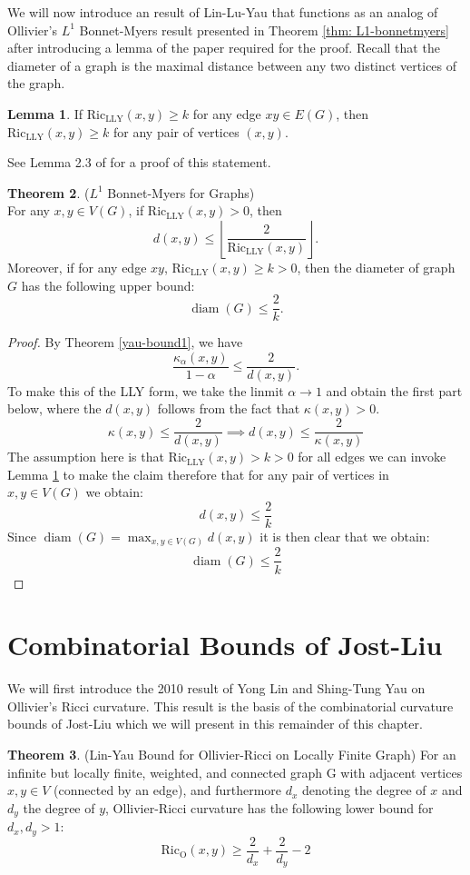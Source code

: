\documentclass{Dissertate}
\theoremstyle{definition}
\newtheorem{theorem}{Theorem}[section]
\theoremstyle{definition} %
\newtheorem{lemma}[theorem]{Lemma}
\theoremstyle{definition}
\begin{document}
We will now introduce an result of Lin-Lu-Yau that functions as an analog of Ollivier's $L^1$ Bonnet-Myers result presented in Theorem \ref{thm: L1-bonnetmyers} after introducing a lemma of the paper required for the proof. Recall that the diameter of a graph is the maximal distance between any two distinct vertices of the graph. 

\begin{lemma} \label{lemma2.3}
If \( \operatorname{Ric_{LLY}}(x, y) \geq k \) for any edge \( xy \in E(G) \), then \( \operatorname{Ric_{LLY}}(x, y) \geq k \) for any pair of vertices \( (x, y) \).
\end{lemma}

See Lemma 2.3 of \cite{lin_ricci_2011} for a proof of this statement. 

\begin{theorem} ($L^1$ Bonnet-Myers for Graphs)\\ 
For any \( x, y \in V(G) \), if \( \operatorname{Ric_{LLY}}(x, y) > 0 \), then
\[
d(x, y) \leq \left\lfloor \frac{2}{\operatorname{Ric_{LLY}}(x, y)} \right\rfloor.
\]
Moreover, if for any edge \( xy \), \( \operatorname{Ric_{LLY}}(x, y) \geq k > 0 \), then the diameter of graph \( G \) has the following upper bound:
$$
\operatorname{diam}(G) \leq \frac{2}{k}.
$$
\end{theorem}
\begin{proof}
By Theorem \ref{yau-bound1}, we have
\[
\frac{\kappa_\alpha(x, y)}{1 - \alpha} \leq \frac{2}{d(x, y)}.
\]
To make this of the LLY form, we take the linmit $\alpha \rightarrow 1$ and obtain the first part below, where the $d(x,y)$ follows from the fact that \( \kappa(x, y) > 0 \).
\[
\kappa(x, y) \leq \frac{2}{d(x, y)} \implies d(x, y) \leq \frac{2}{\kappa(x, y)} 
\]
The assumption here is that $\operatorname{Ric_{LLY}}(x, y) > k > 0 $ for all edges we can invoke Lemma \ref{lemma2.3} to make the claim therefore that for any pair of vertices in $x,y \in V(G)$ we obtain: 
$$
d(x,y) \leq \frac{2}{k}
$$
Since $\operatorname{diam}(G) = \operatorname{max}_{x,y \in V(G)} d(x,y)$ it is then clear that we obtain: 
$$
\operatorname{diam}(G) \leq \frac{2}{k}
$$
\end{proof}



\section*{Combinatorial Bounds of Jost-Liu}

We will first introduce the 2010 result of Yong Lin and Shing-Tung Yau on Ollivier's Ricci curvature. This result is the basis of the combinatorial curvature bounds of Jost-Liu which we will present in this remainder of this chapter. 
\begin{theorem} (Lin-Yau Bound for Ollivier-Ricci on Locally Finite Graph) \cite{lin2010ricci} \label{lin-yau} For an infinite but locally finite, weighted, and connected graph G with adjacent vertices $x,y \in V$ (connected by an edge), and furthermore $d_x$ denoting the degree of $x$ and $d_y$ the degree of $y$, Ollivier-Ricci curvature has the following lower bound for $d_x, d_y > 1$:
$$
\operatorname{Ric_O}(x,y) \geq \frac{2}{d_x} + \frac{2}{d_y} - 2
$$
\end{theorem}
\end{document}
